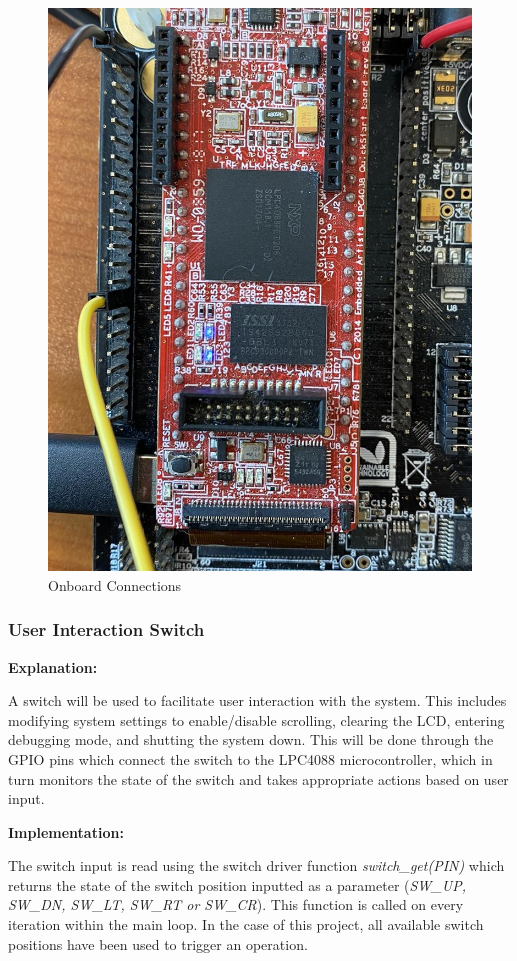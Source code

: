 \documentclass{cce2014-design}
\begin{document}
\begin{figure}[!h]
   \centering
   \includegraphics[width=0.7\linewidth]{board_connections.jpg}
   \caption{Onboard Connections}
   \label{fig:onboardconnections}
\end{figure}

\subsubsection{User Interaction Switch}
\textbf{Explanation:}

A switch will be used to facilitate user interaction with the system.
This includes modifying system settings to enable/disable scrolling, clearing the LCD, entering debugging mode, and shutting the system down.
This will be done through the GPIO pins which connect the switch to the LPC4088 microcontroller, which in turn monitors the state of the switch and takes appropriate actions based on user input.

\vspace{1em}
\textbf{Implementation:}

The switch input is read using the switch driver function \textit{switch\_get(PIN)} which returns the state of the switch position inputted as a parameter (\textit{SW\_UP, SW\_DN, SW\_LT, SW\_RT or SW\_CR}).
This function is called on every iteration within the main loop.
In the case of this project, all available switch positions have been used to trigger an operation.
\end{document}
